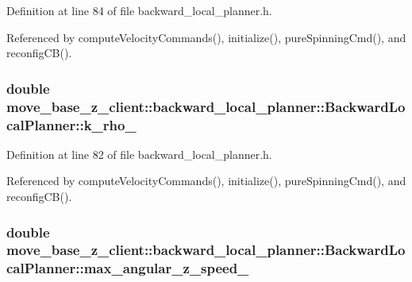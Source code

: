 Definition at line 84 of file backward\+\_\+local\+\_\+planner.\+h.



Referenced by compute\+Velocity\+Commands(), initialize(), pure\+Spinning\+Cmd(), and reconfig\+C\+B().

\subsubsection[{\texorpdfstring{k\+\_\+rho\+\_\+}{k_rho_}}]{\setlength{\rightskip}{0pt plus 5cm}double move\+\_\+base\+\_\+z\+\_\+client\+::backward\+\_\+local\+\_\+planner\+::\+Backward\+Local\+Planner\+::k\+\_\+rho\+\_\+\hspace{0.3cm}{\ttfamily [private]}}\hypertarget{classmove__base__z__client_1_1backward__local__planner_1_1BackwardLocalPlanner_a9ae9a8c4c4663a999ba107aea9f6868d}{}\label{classmove__base__z__client_1_1backward__local__planner_1_1BackwardLocalPlanner_a9ae9a8c4c4663a999ba107aea9f6868d}


Definition at line 82 of file backward\+\_\+local\+\_\+planner.\+h.



Referenced by compute\+Velocity\+Commands(), initialize(), pure\+Spinning\+Cmd(), and reconfig\+C\+B().

\subsubsection[{\texorpdfstring{max\+\_\+angular\+\_\+z\+\_\+speed\+\_\+}{max_angular_z_speed_}}]{\setlength{\rightskip}{0pt plus 5cm}double move\+\_\+base\+\_\+z\+\_\+client\+::backward\+\_\+local\+\_\+planner\+::\+Backward\+Local\+Planner\+::max\+\_\+angular\+\_\+z\+\_\+speed\+\_\+\hspace{0.3cm}{\ttfamily [private]}}\hypertarget{classmove__base__z__client_1_1backward__local__planner_1_1BackwardLocalPlanner_a8b5cbc273dfcf1c5e15ac4475b45ca97}{}\label{classmove__base__z__client_1_1backward__local__planner_1_1BackwardLocalPlanner_a8b5cbc273dfcf1c5e15ac4475b45ca97}


